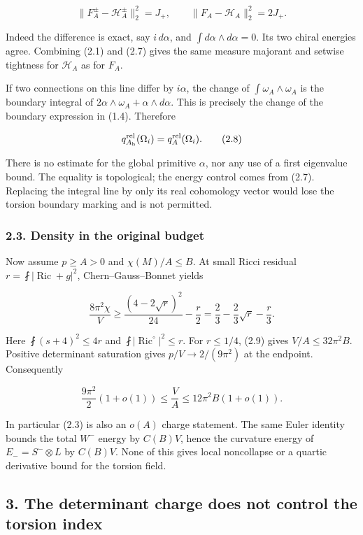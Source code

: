 \documentclass[
  10pt,
]{article}
\begin{document}
\[
 \boxed{\|F_A^\pm-\mathcal H_A^\pm\|_2^2=J_+,\qquad
              \|F_A-\mathcal H_A\|_2^2=2J_+.}
 \tag{2.7}
\]

Indeed the difference is exact, say \(i\,d\alpha\), and
\(\int d\alpha\wedge d\alpha=0\). Its two chiral energies agree.
Combining (2.1) and (2.7) gives the same measure majorant and setwise
tightness for \(\mathcal H_A\) as for \(F_A\).

If two connections on this line differ by \(i\alpha\), the change of
\(\int\omega_A\wedge\omega_A\) is the boundary integral of
\(2\alpha\wedge\omega_A+\alpha\wedge d\alpha\). This is precisely the
change of the boundary expression in (1.4). Therefore

\[
            q_{A_{\rm h}}^{\rm rel}(\Omega_i)=q_A^{\rm rel}(\Omega_i).
 \tag{2.8}
\]

There is no estimate for the global primitive \(\alpha\), nor any use of
a first eigenvalue bound. The equality is topological; the energy
control comes from (2.7). Replacing the integral line by only its real
cohomology vector would lose the torsion boundary marking and is not
permitted.

\hypertarget{density-in-the-original-budget}{%
\subsubsection{2.3. Density in the original
budget}\label{density-in-the-original-budget}}

Now assume \(p\ge A>0\) and \(\chi(M)/A\le B\). At small Ricci residual
\(r=\fint|\operatorname{Ric}+g|^2\), Chern--Gauss--Bonnet yields

\[
 \frac{8\pi^2\chi}V\ge
 \frac{(4-2\sqrt r)^2}{24}-\frac r2
                 =\frac23-\frac23\sqrt r-\frac r3.
 \tag{2.9}
\]

Here \(\fint(s+4)^2\le4r\) and
\(\fint|\operatorname{Ric}^{\circ}|^2\le r\). For \(r\le1/4\), (2.9)
gives \(V/A\le32\pi^2B\). Positive determinant saturation gives
\(p/V\to2/(9\pi^2)\) at the endpoint. Consequently

\[
 \frac{9\pi^2}{2}(1+o(1))\le\frac VA
                         \le12\pi^2B(1+o(1)).
 \tag{2.10}
\]

In particular (2.3) is also an \(o(A)\) charge statement. The same Euler
identity bounds the total \(W^-\) energy by \(C(B)V\), hence the
curvature energy of \(E_-=S^-\otimes L\) by \(C(B)V\). None of this
gives local noncollapse or a quartic derivative bound for the torsion
field.

\hypertarget{the-determinant-charge-does-not-control-the-torsion-index}{%
\subsection{3. The determinant charge does not control the torsion
index}\label{the-determinant-charge-does-not-control-the-torsion-index}}
\end{document}

